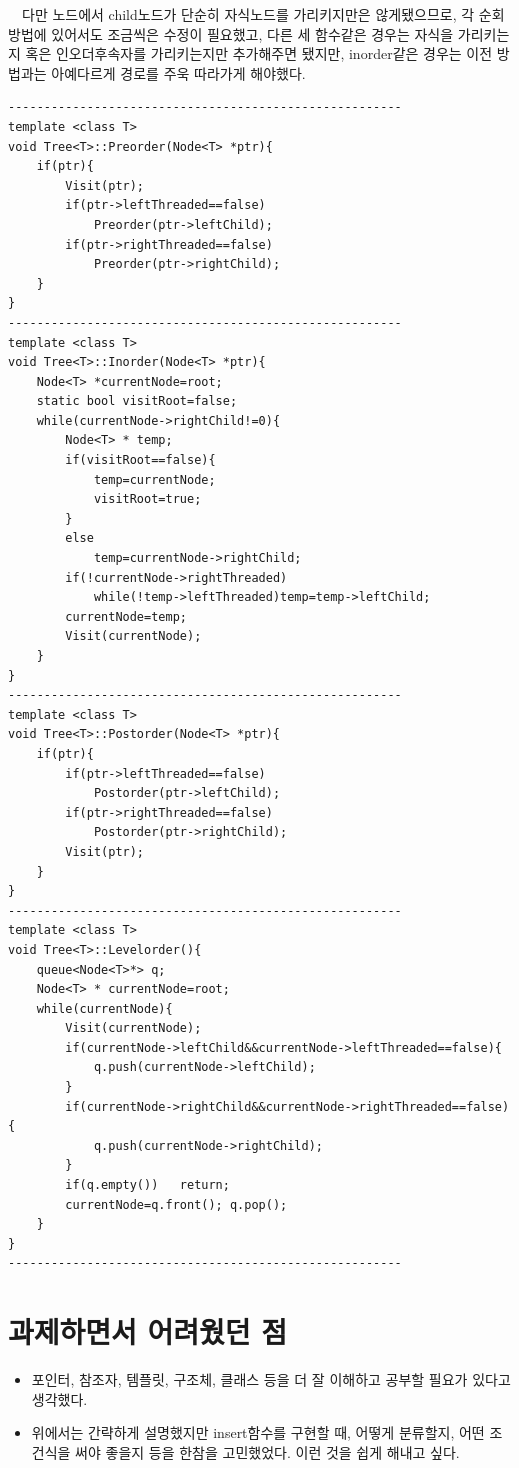 \documentclass[a4paper,11pt]{article}
\begin{document}
\ \ 다만 노드에서 child노드가 단순히 자식노드를 가리키지만은 않게됐으므로, 각 순회방법에 있어서도 조금씩은 수정이 필요했고, 다른 세 함수같은 경우는 자식을 가리키는지 혹은 인오더후속자를 가리키는지만 추가해주면 됐지만, inorder같은 경우는 이전 방법과는 아예다르게 경로를 주욱 따라가게 해야했다.
\begin{Verbatim}
-------------------------------------------------------
template <class T>
void Tree<T>::Preorder(Node<T> *ptr){
    if(ptr){
        Visit(ptr);
        if(ptr->leftThreaded==false)
            Preorder(ptr->leftChild);
        if(ptr->rightThreaded==false)
            Preorder(ptr->rightChild);
    }
}
-------------------------------------------------------
template <class T>
void Tree<T>::Inorder(Node<T> *ptr){
    Node<T> *currentNode=root;
    static bool visitRoot=false;
    while(currentNode->rightChild!=0){
        Node<T> * temp;
        if(visitRoot==false){
            temp=currentNode;
            visitRoot=true;
        }
        else
            temp=currentNode->rightChild;       
        if(!currentNode->rightThreaded)
            while(!temp->leftThreaded)temp=temp->leftChild;
        currentNode=temp;
        Visit(currentNode);
    }    
}
-------------------------------------------------------
template <class T>
void Tree<T>::Postorder(Node<T> *ptr){
    if(ptr){
        if(ptr->leftThreaded==false)
            Postorder(ptr->leftChild);
        if(ptr->rightThreaded==false)
            Postorder(ptr->rightChild);
        Visit(ptr);
    }
}
-------------------------------------------------------
template <class T>
void Tree<T>::Levelorder(){
    queue<Node<T>*> q;
    Node<T> * currentNode=root;
    while(currentNode){
        Visit(currentNode);
        if(currentNode->leftChild&&currentNode->leftThreaded==false){
            q.push(currentNode->leftChild);
        }
        if(currentNode->rightChild&&currentNode->rightThreaded==false){
            q.push(currentNode->rightChild);
        }
        if(q.empty())   return;
        currentNode=q.front(); q.pop(); 
    }
}
-------------------------------------------------------
\end{Verbatim}
\section{과제하면서 어려웠던 점}
\begin{itemize}
\item 포인터, 참조자, 템플릿, 구조체, 클래스 등을 더 잘 이해하고 공부할 필요가 있다고 생각했다.
\item 위에서는 간략하게 설명했지만 insert함수를 구현할 때, 어떻게 분류할지, 어떤 조건식을 써야 좋을지 등을 한참을 고민했었다. 이런 것을 쉽게 해내고 싶다.
\end{itemize}
\end{document}
